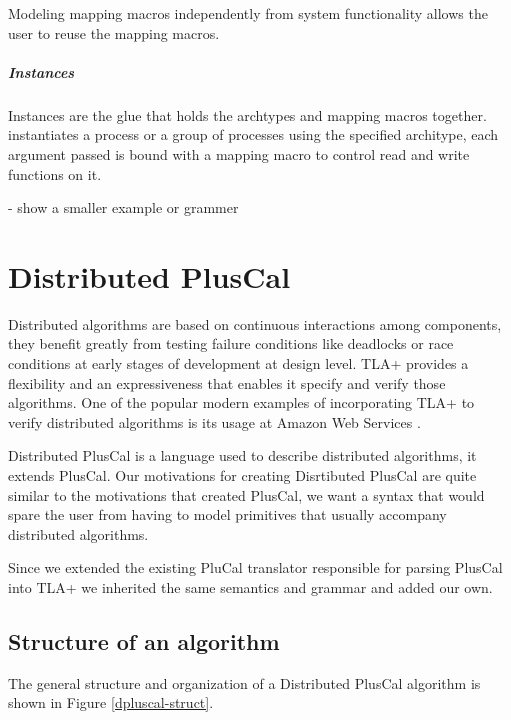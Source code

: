 \documentclass{thesul}
\begin{document}
Modeling mapping macros independently from system functionality allows the user to reuse the mapping macros.

\paragraph{Instances}

Instances are the glue that holds the archtypes and mapping macros together.
instantiates a process or a group of processes using the specified architype, each argument passed is bound with a mapping macro to control read and write functions on it.

- show a smaller example or grammer

\chapter{Distributed PlusCal}


Distributed algorithms are based on continuous interactions among components, they benefit greatly from testing failure conditions like deadlocks or race conditions at early stages of development at design level.
TLA+ provides a flexibility and an expressiveness that enables it specify and verify those algorithms. One of the popular modern examples of incorporating TLA+ to verify distributed algorithms is its usage at Amazon Web Services \cite{amazon}.

Distributed PlusCal is a language used to describe distributed algorithms, it extends PlusCal. 
Our motivations for creating Disrtibuted PlusCal are quite similar to the motivations that created PlusCal, we want a syntax that would spare the user from having to model primitives that usually accompany distributed algorithms.

Since we extended the existing PluCal translator responsible for parsing PlusCal into TLA+ we inherited the same semantics and grammar and added our own.

\section{Structure of an algorithm}

The general structure and organization of a Distributed PlusCal algorithm is shown in Figure \ref{dpluscal-struct}.
\end{document}
